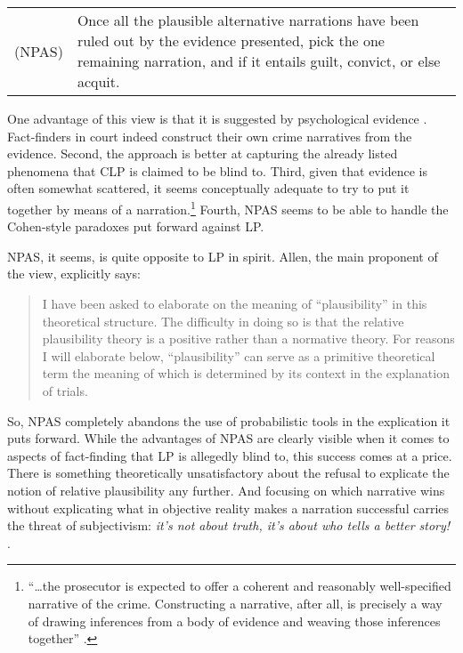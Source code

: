 \documentclass[10pt,leqno]{article}
\begin{document}
 \begin{center}
\begin{tabular}{lp{7.5cm}}
(NPAS)&Once all the plausible alternative narrations have been ruled out by the evidence presented, pick the one remaining narration, and if it entails guilt, convict, or else acquit.\end{tabular}
\end{center}

One advantage of this view is that it is suggested by psychological evidence \citep{pennington1991cognitive,pennington1992explaining,pennington1993story}. Fact-finders in court indeed construct their own crime narratives from the evidence. Second, the approach is better at capturing the already listed  phenomena that CLP is claimed to be blind to. Third, 
 given that evidence is often somewhat scattered, it seems conceptually adequate to try to put it together by means of a narration.\footnote{``\dots  the prosecutor is expected to offer a coherent and reasonably well-specified narrative of the crime. Constructing a narrative, after all, is precisely a way of drawing inferences from a body of evidence and weaving those inferences together'' \citep[24]{di2013statistics}.}
Fourth, NPAS seems to be able to handle the Cohen-style paradoxes put forward against LP.



NPAS, it seems, is quite opposite to LP in spirit. Allen, the main proponent of the view, explicitly says:
\begin{quote}
I have been asked to elaborate on the meaning of “plausibility” in this theoretical structure. The difficulty in doing so is that the relative plausibility theory is a positive rather than a normative theory. For reasons I will elaborate below, “plausibility” can serve as a primitive theoretical term the meaning of which is determined by its context in the explanation of trials.
\citep[10]{allen2010no}
\end{quote}
So, NPAS completely abandons the use of probabilistic tools in the explication it puts forward. While the advantages of NPAS are clearly visible when it comes to aspects of fact-finding that LP is allegedly blind to, this success comes at a price.
 There is something theoretically unsatisfactory about the  refusal to explicate the notion of relative plausibility any further. And focusing on which narrative wins without explicating what in objective reality makes a narration successful carries the threat of subjectivism: \emph{it's not about truth, it's about who tells a better story!} \citep[see ][for a discussion]{griffin2012narrative}.
\end{document}
